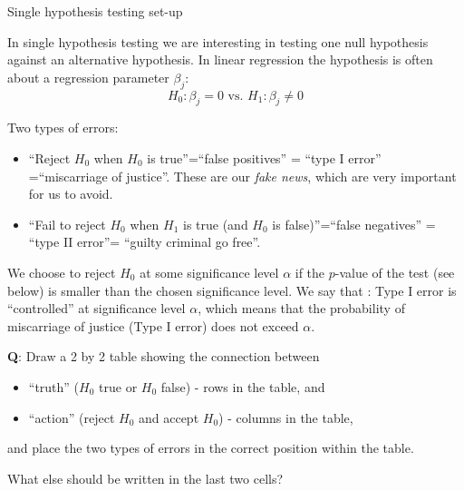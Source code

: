 \documentclass[ignorenonframetext,]{beamer}
\providecommand{\tightlist}{%
  \setlength{\itemsep}{0pt}\setlength{\parskip}{0pt}}
\begin{document}
\begin{frame}

\begin{block}{Single hypothesis testing set-up}

In single hypothesis testing we are interesting in testing one null
hypothesis against an alternative hypothesis. In linear regression the
hypothesis is often about a regression parameter \(\beta_j\):
\[H_0: \beta_j=0 \text{ vs. } H_1: \beta_j\neq 0\]

\begin{block}{Two types of errors:}

\begin{itemize}
\item
  ``Reject \(H_0\) when \(H_0\) is true''=``false positives'' = ``type I
  error'' =``miscarriage of justice''. These are our \emph{fake news},
  which are very important for us to avoid.
\item
  ``Fail to reject \(H_0\) when \(H_1\) is true (and \(H_0\) is
  false)''=``false negatives'' = ``type II error''= ``guilty criminal go
  free''.
\end{itemize}

\end{block}

\end{block}

\end{frame}

\begin{frame}

We choose to reject \(H_0\) at some significance level \(\alpha\) if the
\(p\)-value of the test (see below) is smaller than the chosen
significance level. We say that : Type I error is ``controlled'' at
significance level \(\alpha\), which means that the probability of
miscarriage of justice (Type I error) does not exceed \(\alpha\).

\textbf{Q}: Draw a 2 by 2 table showing the connection between

\begin{itemize}
\tightlist
\item
  ``truth'' (\(H_0\) true or \(H_0\) false) - rows in the table, and
\item
  ``action'' (reject \(H_0\) and accept \(H_0\)) - columns in the table,
\end{itemize}

and place the two types of errors in the correct position within the
table.

What else should be written in the last two cells?

\end{frame}
\end{document}
